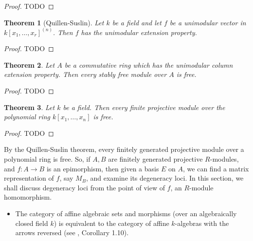 \documentclass{amsart}
\newtheorem{theorem}{Theorem}[section]
\theoremstyle{definition}
\theoremstyle{remark}
\numberwithin{equation}{section}
\begin{document}
\begin{proof}
  TODO
\end{proof}


\begin{theorem}[Quillen-Suslin]
  Let $k$ be a field and let $f$ be a unimodular vector in $k[x_1, \dots, x_r]^{(n)}$. Then $f$ has the unimodular extension property. 
\end{theorem}

\begin{proof}
  TODO
\end{proof}

\begin{theorem}
  Let $A$ be a commutative ring which has the unimodular column extension property. Then every stably free module over $A$ is free. 
\end{theorem}

\begin{proof}
  TODO
\end{proof}

\begin{theorem}
  Let $k$ be a field. Then every finite projective module over the polynomial ring $k[x_1, \dots, x_n]$ is free.
\end{theorem}

\begin{proof}
  TODO
\end{proof}

By the Quillen-Suslin theorem, every finitely generated projective module over a polynomial ring is free. So, if $A, B$ are finitely generated projective $R$-modules, and $f: A \to B$ is an epimorphism, then given a basis $E$ on $A$, we can find a matrix representation of $f$, say $M_B$, and examine its degeneracy loci. In this section, we shall discuss degeneracy loci from the point of view of $f$, an $R$-module homomorphism.

\begin{aroundtodo}[prepend, caption={\textbf{Todo}}]
  \begin{itemize}
  \item The category of affine algebraic sets and morphisms (over an algebraically closed field $k$) is equivalent to the category of affine $k$-algebras with the arrows reversed (see \cite{MR1322960}, Corollary 1.10).
  \end{itemize}
\end{aroundtodo}
\end{document}
